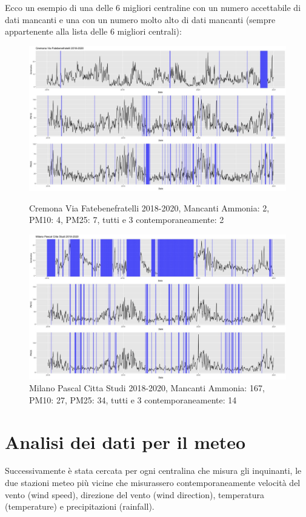 \documentclass{article}
\begin{document}
Ecco un esempio di una  delle 6 migliori centraline con un numero accettabile di dati mancanti e una con
un numero molto alto di dati mancanti (sempre appartenente alla lista delle 6 migliori centrali):

\begin{figure}[]
    \centering
    \includegraphics[scale=0.35]{Cremona Via Fatebenefratelli 2018-2020 .jpeg} 
    \caption{Cremona Via Fatebenefratelli 2018-2020, Mancanti Ammonia: 2, PM10: 4, PM25: 7, tutti e 3 contemporaneamente: 2}
    \centering
    \includegraphics[scale=0.35]{Milano Pascal Citta Studi 2018-2020 .jpeg}
    \caption{Milano Pascal Citta Studi 2018-2020, Mancanti Ammonia: 167, PM10: 27, PM25: 34, tutti e 3 contemporaneamente: 14}
\end{figure}

\section{Analisi dei dati per il meteo}
Successivamente è stata cercata per ogni centralina che misura gli inquinanti, le due  
stazioni meteo più vicine che misurassero contemporaneamente velocità del vento (wind speed), direzione del vento (wind direction), 
temperatura (temperature) e precipitazioni (rainfall).
\end{document}
